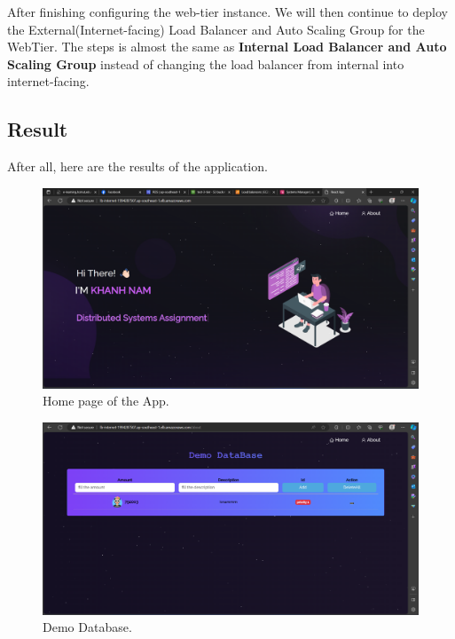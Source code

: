 \documentclass{article}
\begin{document}
After finishing configuring the web-tier instance. We will then continue to deploy the External(Internet-facing) Load Balancer and Auto Scaling Group for the WebTier. The steps is almost the same as \textbf{Internal Load Balancer and Auto Scaling Group} instead of changing the load balancer from internal into internet-facing.\par

\subsection{Result}
After all, here are the results of the application.\par

\begin{figure}[h]
    \centering
    \includegraphics[width=12cm]{Pictures/Internet/Result_1.png}
    \caption{Home page of the App.}
    \label{fig:enter-label}
\end{figure}

\begin{figure}[h]
    \centering
    \includegraphics[width=12cm]{Pictures/Internet/Result_2.png}
    \caption{Demo Database.}
    \label{fig:enter-label}
\end{figure}
\newpage
\end{document}
